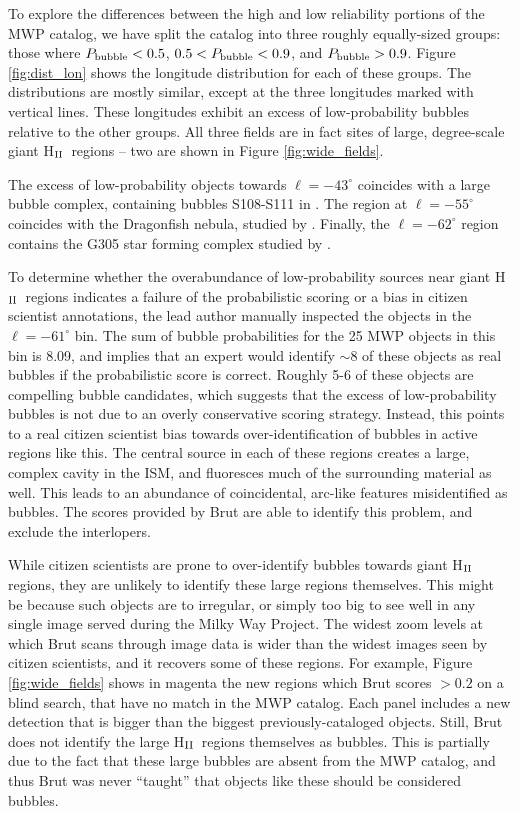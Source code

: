 \documentclass[preprint]{aastex}
\newcommand{\hii}[0]{H$_{\rm II}$}
\begin{document}
To explore the differences between the high and low reliability portions of the MWP catalog, we have split the catalog into three roughly equally-sized groups: those where $P_{\rm bubble} < 0.5$, $0.5 < P_{\rm bubble} < 0.9$,
and $P_{\rm bubble} > 0.9$. Figure \ref{fig:dist_lon} shows the longitude distribution for each of these groups. The distributions are mostly similar, except at the three longitudes marked with vertical lines. These longitudes exhibit an excess of low-probability bubbles relative to the other groups.  All three fields are in fact sites of large, degree-scale giant \hii\, regions -- two are shown in Figure \ref{fig:wide_fields}. 

The excess of low-probability objects towards $\ell=-43^\circ$ coincides with a large bubble complex, containing bubbles S108-S111 in \cite{Churchwell06}. The region at $\ell=-55^\circ$ coincides with the Dragonfish nebula, studied by \cite{Rahman11}. Finally, the $\ell=-62^\circ$ region contains the G305 star forming complex studied by \cite{Hindson12}.

To determine whether the overabundance of low-probability sources near giant \hii\, regions indicates a failure of the probabilistic scoring or a bias in citizen scientist annotations, the lead author manually inspected the objects in the $\ell=-61^\circ$ bin. The sum of bubble probabilities for the 25 MWP objects in this bin is 8.09, and implies that an expert would identify $\sim 8$ of these objects as real bubbles if the probabilistic score is correct. Roughly 5-6 of these objects are compelling bubble candidates, which suggests that the excess of low-probability bubbles is not due to an overly conservative scoring strategy. Instead, this points to a real citizen scientist bias towards over-identification of bubbles in active regions like this. The central source in each of these regions creates a large, complex cavity in the ISM, and fluoresces much of the surrounding material as well. This leads to an abundance of coincidental, arc-like features misidentified as bubbles. The scores provided by Brut are able to identify this problem, and exclude the interlopers.

While citizen scientists are prone to over-identify bubbles towards giant \hii\, regions, they are unlikely to identify these large regions themselves. This might be because such objects are to irregular, or simply too big to see well in any single image served during the Milky Way Project. The widest zoom levels at which Brut scans through image data is wider than the widest images seen by citizen scientists, and it recovers some of these regions. For example, Figure \ref{fig:wide_fields} shows in magenta the new regions which Brut scores $>0.2$ on a blind search, that have no match in the MWP catalog. Each panel includes a new detection that is bigger than the biggest previously-cataloged objects. Still, Brut does not identify the large \hii\, regions themselves as bubbles. This is partially due to the fact that these large bubbles are absent from the MWP catalog, and thus Brut was never ``taught'' that objects like these should be considered bubbles.
\end{document}
